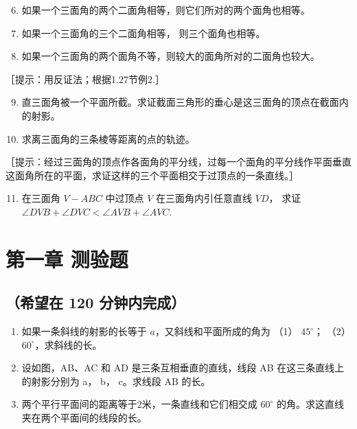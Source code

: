 \begin{enumerate}
\setcounter{enumi}{5}
\item
  如果一个三面角的两个二面角相等，则它们所对的两个面角也相等。
\item
  如果一个三面角的三个二面角相等， 则三个面角也相等。
\item
  如果一个三面角的两个面角不等，则较大的面角所对的二面角也较大。
\end{enumerate}

［提示：用反证法；根据1.27节例2.］

\begin{enumerate}
\setcounter{enumi}{8}
\item
  直三面角被一个平面所截。求证截面三角形的垂心是这三面角的顶点在截面内的射影。
\item
  求离三面角的三条棱等距离的点的轨迹。
\end{enumerate}

［提示：经过三面角的顶点作各面角的平分线，过每一个面角的平分线作平面垂直这面角所在的平面，求证这样的三个平面相交于过顶点的一条直线。］

\begin{enumerate}
\setcounter{enumi}{10}
\item
  在三面角 \(V - ABC\) 中过顶点 \(V\) 在三面角内引任意直线 \(VD\)， 求证
  \(\angle DVB + \angle DVC < \angle AVB + \angle AVC\).
\end{enumerate}

\section{第一章 测验题}

\subsection{（希望在 120
分钟内完成）}

\begin{enumerate}
\item
  如果一条斜线的射影的长等于 \(a\)，又斜线和平面所成的角为 （1）
  \(45^{\circ}\)； （2） \(60^{\circ}\)，求斜线的长。
\item
  设如图，AB、AC 和 AD 是三条互相垂直的直线，线段 AB
  在这三条直线上的射影分别为 a， b， c。求线段 AB 的长。
\item
  两个平行平面间的距离等于2米，一条直线和它们相交成 \(60^{\circ}\)
  的角。求这直线夹在两个平面间的线段的长。
\end{enumerate}

